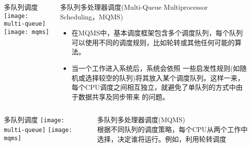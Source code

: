 \begin{frame}
	\begin{columns}
		\begin{column}{.5\textwidth}
			\Large \centering
			多队列调度
			\texttt{[image: multi-queue]}
			\texttt{[image: mqms]}	
		\end{column}
		
		\begin{column}{.5\textwidth}
			\large
			多队列多处理器调度(Multi-Queue Multiprocessor Scheduling，MQMS) \\
			\normalsize
			\begin{itemize}
			\item 在MQMS中，基本调度框架包含多个调度队列，每个队列可以使用不同的调度规则，比如轮转或其他任何可能的算法。
			
			\item 当一个工作进入系统后，系统会依照 一些启发性规则(如随机或选择较空的队列)将其放入某个调度队列。这样一来，每个CPU调度之间相互独立，就避免了单队列的方式中由于数据共享及同步带来 的问题。
			\end{itemize}
		\end{column}
	\end{columns}
\end{frame}


\begin{frame}
	\begin{columns}
		\begin{column}{.5\textwidth}
			\Large \centering
			多队列调度
			\texttt{[image: multi-queue]}
			\texttt{[image: mqms]}	
		\end{column}
		
		\begin{column}{.5\textwidth}
			\large
			多队列多处理器调度(MQMS) 
			\normalsize
			\\
			根据不同队列的调度策略，每个CPU从两个工作中选择，决定谁将运行。例如，利用轮转调度

		\end{column}
	\end{columns}
\end{frame}










